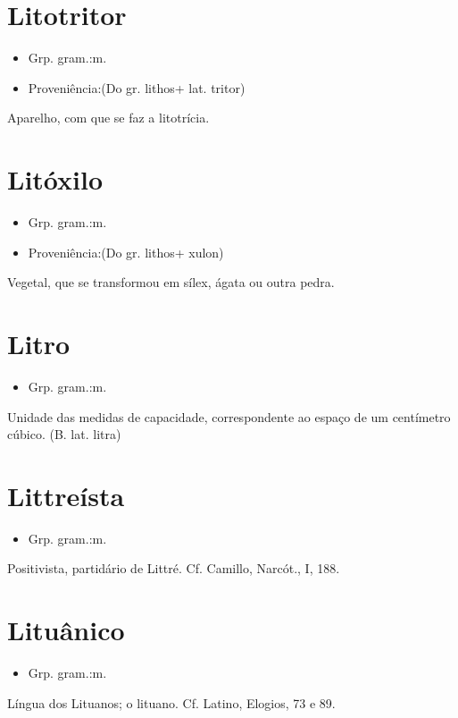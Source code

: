 \section{Litotritor}
\begin{itemize}
\item {Grp. gram.:m.}
\end{itemize}
\begin{itemize}
\item {Proveniência:(Do gr. \textunderscore lithos\textunderscore  + lat. \textunderscore tritor\textunderscore )}
\end{itemize}
Aparelho, com que se faz a litotrícia.
\section{Litóxilo}
\begin{itemize}
\item {Grp. gram.:m.}
\end{itemize}
\begin{itemize}
\item {Proveniência:(Do gr. \textunderscore lithos\textunderscore  + \textunderscore xulon\textunderscore )}
\end{itemize}
Vegetal, que se transformou em sílex, ágata ou outra pedra.
\section{Litro}
\begin{itemize}
\item {Grp. gram.:m.}
\end{itemize}
Unidade das medidas de capacidade, correspondente ao espaço de um centímetro cúbico.
(B. lat. \textunderscore litra\textunderscore )
\section{Littreísta}
\begin{itemize}
\item {Grp. gram.:m.}
\end{itemize}
Positivista, partidário de Littré. Cf. Camillo, \textunderscore Narcót.\textunderscore , I, 188.
\section{Lituânico}
\begin{itemize}
\item {Grp. gram.:m.}
\end{itemize}
Língua dos Lituanos; o lituano. Cf. Latino, \textunderscore Elogios\textunderscore , 73 e 89.
